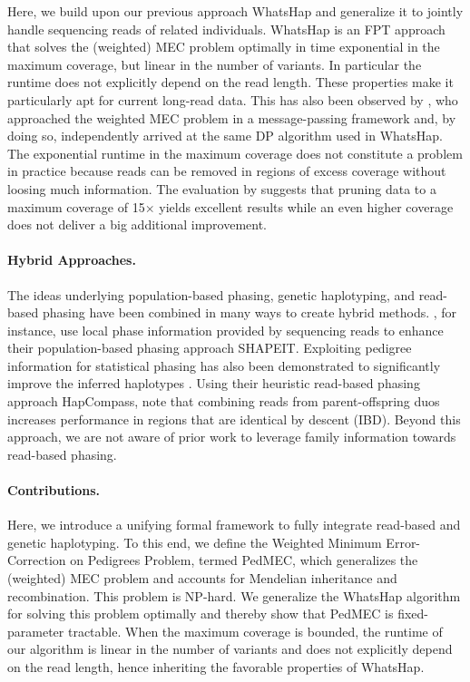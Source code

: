 Here, we build upon our previous approach WhatsHap \citep{Patterson2014,Patterson2015} and generalize it to jointly handle sequencing reads of related individuals.
WhatsHap is an FPT approach that solves the (weighted) MEC problem optimally in time exponential in the maximum coverage, but linear in the number of variants.
In particular the runtime does not explicitly depend on the read length.
These properties make it particularly apt for current long-read data. 
This has also been observed by \citet{Kuleshov2014b}, who approached the weighted MEC problem in a message-passing framework and, by doing so, independently arrived at the same DP algorithm used in WhatsHap.
The exponential runtime in the maximum coverage does not constitute a problem in practice because reads can be removed in regions of excess coverage without loosing much information.
The evaluation by \cite{Patterson2015} suggests that pruning data to a maximum coverage of 15$\times$ yields excellent results while an even higher coverage does not deliver a big additional improvement.
\paragraph{Hybrid Approaches.}
The ideas underlying population-based phasing, genetic haplotyping, and read-based phasing have been combined in many ways to create hybrid methods.
\cite{Delaneau2013a}, for instance, use local phase information provided by sequencing reads to enhance their population-based phasing approach SHAPEIT.
Exploiting pedigree information for statistical phasing has also been demonstrated to significantly improve the inferred haplotypes \citep{Marchini2006,Chen2013a}.
Using their heuristic read-based phasing approach HapCompass, \cite{Aguiar2013} note that combining reads from parent-offspring duos increases performance in regions that are identical by descent (IBD). 
Beyond this approach, we are not aware of prior work to leverage family information towards read-based phasing.

\paragraph{Contributions.}
Here, we introduce a unifying formal framework to fully integrate read-based and genetic haplotyping.
To this end, we define the Weighted Minimum Error-Correction on Pedigrees Problem, termed PedMEC, which generalizes the (weighted) MEC problem and accounts for Mendelian inheritance and recombination.
This problem is NP-hard.
We generalize the WhatsHap algorithm for solving this problem optimally and thereby show that PedMEC is fixed-parameter tractable.
When the maximum coverage is bounded, the runtime of our algorithm is linear in the number of variants and does not explicitly depend on the read length, hence inheriting the favorable properties of WhatsHap.

